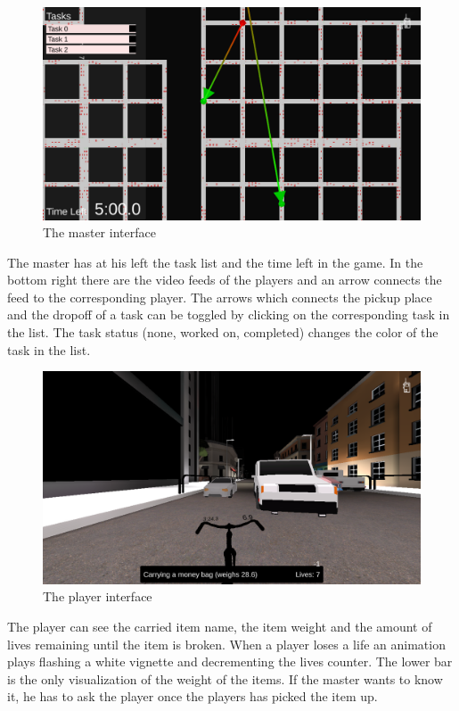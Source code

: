 \documentclass[12pt]{article}
\begin{document}
\begin{figure}[H]
\includegraphics[width=\textwidth]{master}
\caption{The master interface}
\end{figure}
The master has at his left the task list and the time left in the game. In the bottom right there are the video feeds of the players and an arrow connects the feed to the corresponding player. The arrows which connects the pickup place and the dropoff of a task can be toggled by clicking on the corresponding task in the list. The task status (none, worked on, completed) changes the color of the task in the list.
\begin{figure}[H]
\includegraphics[width=\textwidth]{gameplay}
\caption{The player interface}
\end{figure}
The player can see the carried item name, the item weight and the amount of lives remaining until the item is broken. When a player loses a life an animation plays flashing a white vignette and decrementing the lives counter. The lower bar is the only visualization of the weight of the items. If the master wants to know it, he has to ask the player once the players has picked the item up. 
\end{document}
